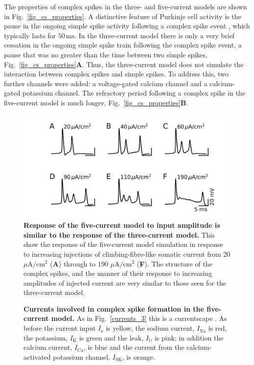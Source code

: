 \documentclass[twocolumn]{svjour3}          %
\newcommand{\mse}{\,\mathrm{ms}}
\renewcommand{\k}{\mathrm{K}}
\newcommand{\ca}{\mathrm{Ca}}
\newcommand{\na}{\mathrm{Na}}
\newcommand{\sk}{\mathrm{SK}}
\newcommand{\leak}{\mathrm{l}}
\begin{document}
The properties of complex spikes in the three- and five-current models
are shown in Fig.~\ref{fig_cs_properties}. A distinctive feature of
Purkinje cell activity is the pause in the ongoing simple spike
activity following a complex spike event
\citep{BellGrimm1969,GranitPhillips1956,Thach1967}, which typically
lasts for $50\mse$. In the three-current model there is only a very
brief cessation in the ongoing simple spike train following the
complex spike event, a pause that was no greater than the time between
two simple spikes, Fig.~\ref{fig_cs_properties}\textbf{A}. Thus, the
three-current model does not simulate the interaction between complex
spikes and simple spikes. To address this, two further channels were
added: a voltage-gated calcium channel and a calcium-gated potassium
channel. The refractory period following a complex spike in the
five-current model is much longer,
Fig.~\ref{fig_cs_properties}\textbf{B}.




\begin{figure}[!ht]
  \includegraphics[width=\linewidth]{figure_cs_i_5}
\caption{\textbf{Response of the five-current model to input amplitude is
    similar to the response of the three-current model.}  This show the response of the
  five-current model simulation in response to increasing injections
  of climbing-fibre-like somatic current from 20 $\mu$A$/$cm$^2$
  (\textbf{A}) through to 190 $\mu$A$/$cm$^2$ (\textbf{F}). The
  structure of the complex spikes, and the manner of their response to
  increasing amplitudes of injected current are very similar to those seen for the three-current model.}
\label{fig_cs_i_5}
\end{figure}


\begin{figure}
  \begin{center}
    
    \caption{\textbf{Currents involved in complex spike formation in
        the five-current model.} As in Fig.~\ref{currents_3} this is a
      currentscape \cite{AlonsoMarder2019}. As before the current
      input $I_{\mathrm{e}}$ is yellow, the sodium current, $I_{\na}$
      is red, the potassium, $I_{\k}$ is green and the leak,
      $I_{\leak}$, is pink; in addition the calcium current,
      $I_{\ca}$, is blue and the current from the calcium-activated
      potassium channel, $I_\sk$, is orange.}
    \label{fig_currents_5}
  \end{center}
  \end{figure}
\end{document}
